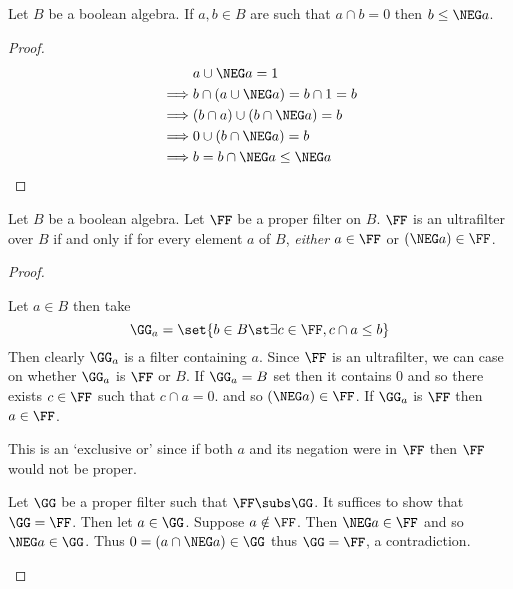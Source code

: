 \begin{lem}
    Let $B$ be a boolean algebra.
    If $a,b \in B$ are such that $a \cap b = 0$ then $b \leq \NEG a$.
\end{lem}
\begin{proof}
    \begin{align*}
        &a \cup \NEG a = 1\\
        \implies & b \cap (a \cup \NEG a) = b \cap 1 = b\\
        \implies & (b \cap a) \cup (b \cap \NEG a) = b\\
        \implies & 0 \cup (b \cap \NEG a) = b\\
        \implies & b = b \cap \NEG a \leq \NEG a
    \end{align*}
\end{proof}

\begin{prop}
    Let $B$ be a boolean algebra. 
    Let $\FF$ be a proper filter on $B$.
    $\FF$ is an ultrafilter over $B$ if and only if for every element 
    $a$ of $B$,
    \emph{either} $a \in \FF$ or $(\NEG a) \in \FF$.
\end{prop}
\begin{proof}
    \begin{forward}
        Let $a \in B$ then take 
        \[\GG_a = \set{b \in B \st \exists c \in \FF, c \cap a \leq b}\]
        Then clearly $\GG_a$ is a filter containing $a$.
        Since $\FF$ is an ultrafilter, 
        we can case on whether $\GG_a$ is $\FF$ or $B$.
        If $\GG_a = B$ set then it contains $0$ and so 
        there exists $c \in \FF$ such that 
        $c \cap a = 0$.
        and so $(\NEG a) \in \FF$.
        If $\GG_a$ is $\FF$ then $a \in \FF$.

        This is an `exclusive or' since if both $a$ 
        and its negation were in $\FF$ then $\FF$ would not be proper.
    \end{forward}
    \begin{backward}
        Let $\GG$ be a proper filter such that $\FF \subs \GG$.
        It suffices to show that $\GG = \FF$.
        Then let $a \in \GG$.
        Suppose $a \notin \FF$.
        Then $\NEG a \in \FF$ and so $\NEG a \in \GG$.
        Thus $0 = (a \cap \NEG a) \in \GG$ 
        thus $\GG = \FF$, a contradiction.
    \end{backward}
\end{proof}

